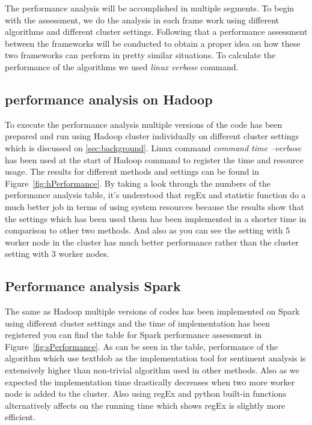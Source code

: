 The performance analysis will be accomplished in multiple segments. To begin with the assessment, we do the analysis in each frame work using different algorithms and different cluster settings. Following that a performance assessment between the frameworks will be conducted to obtain a  proper idea on how these two frameworks can perform in pretty similar situations. To calculate the performance of the algorithms we used \emph{linux verbose} command.

\subsection{performance analysis on Hadoop}
To execute the performance analysis multiple versions of the code has been prepared and run using Hadoop cluster individually on different cluster settings which is discussed on \ref{sec:background}. Linux command \emph{command time --verbose} has been used at the start of Hadoop command to register the time and resource usage. The results for different methods and settings can be found in Figure~\ref{fig:hPerformance}. By taking a look through the numbers of the performance analysis table, it's understood that regEx and statistic function do a much better job in terms of using system resources because the results show that the settings which has been used them has been implemented in a shorter time in comparison to other two methods. And also as you can see the setting with 5 worker node in the cluster has much better performance rather than the cluster setting with 3 worker nodes.

\subsection{Performance analysis Spark}
The same as Hadoop multiple versions of codes has been implemented on Spark using different cluster settings and the time of implementation has been registered you can find the table for Spark performance assessment in Figure~\ref{fig:sPerformance}. As can be seen in the table, performance of the algorithm which use textblob as the implementation tool for sentiment analysis is extensively higher than non-trivial algorithm used in other methods. Also as we expected the implementation time drastically decreases when two more worker node is added to the cluster.
Also using regEx and python built-in functions alternatively affects on the running time which shows regEx is slightly more efficient. 




